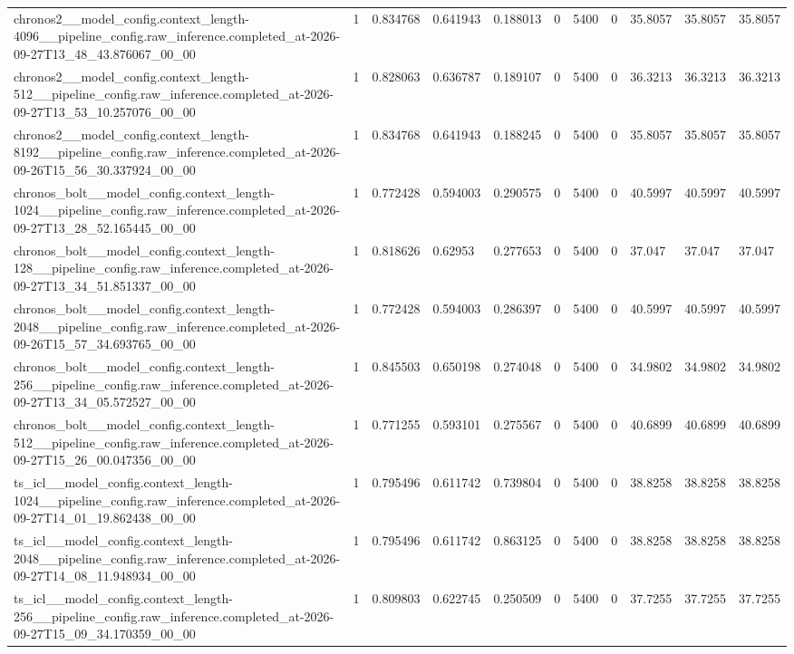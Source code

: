 \begin{tabular}{lllllllllll}
chronos2\_\_model\_config.context\_length-4096\_\_pipeline\_config.raw\_inference.completed\_at-2026-09-27T13\_48\_43.876067\_00\_00 & 1 & 0.834768 & 0.641943 & 0.188013 & 0 & 5400 & 0 & 35.8057 & 35.8057 & 35.8057 \\
chronos2\_\_model\_config.context\_length-512\_\_pipeline\_config.raw\_inference.completed\_at-2026-09-27T13\_53\_10.257076\_00\_00 & 1 & 0.828063 & 0.636787 & 0.189107 & 0 & 5400 & 0 & 36.3213 & 36.3213 & 36.3213 \\
chronos2\_\_model\_config.context\_length-8192\_\_pipeline\_config.raw\_inference.completed\_at-2026-09-26T15\_56\_30.337924\_00\_00 & 1 & 0.834768 & 0.641943 & 0.188245 & 0 & 5400 & 0 & 35.8057 & 35.8057 & 35.8057 \\
chronos\_bolt\_\_model\_config.context\_length-1024\_\_pipeline\_config.raw\_inference.completed\_at-2026-09-27T13\_28\_52.165445\_00\_00 & 1 & 0.772428 & 0.594003 & 0.290575 & 0 & 5400 & 0 & 40.5997 & 40.5997 & 40.5997 \\
chronos\_bolt\_\_model\_config.context\_length-128\_\_pipeline\_config.raw\_inference.completed\_at-2026-09-27T13\_34\_51.851337\_00\_00 & 1 & 0.818626 & 0.62953 & 0.277653 & 0 & 5400 & 0 & 37.047 & 37.047 & 37.047 \\
chronos\_bolt\_\_model\_config.context\_length-2048\_\_pipeline\_config.raw\_inference.completed\_at-2026-09-26T15\_57\_34.693765\_00\_00 & 1 & 0.772428 & 0.594003 & 0.286397 & 0 & 5400 & 0 & 40.5997 & 40.5997 & 40.5997 \\
chronos\_bolt\_\_model\_config.context\_length-256\_\_pipeline\_config.raw\_inference.completed\_at-2026-09-27T13\_34\_05.572527\_00\_00 & 1 & 0.845503 & 0.650198 & 0.274048 & 0 & 5400 & 0 & 34.9802 & 34.9802 & 34.9802 \\
chronos\_bolt\_\_model\_config.context\_length-512\_\_pipeline\_config.raw\_inference.completed\_at-2026-09-27T15\_26\_00.047356\_00\_00 & 1 & 0.771255 & 0.593101 & 0.275567 & 0 & 5400 & 0 & 40.6899 & 40.6899 & 40.6899 \\
ts\_icl\_\_model\_config.context\_length-1024\_\_pipeline\_config.raw\_inference.completed\_at-2026-09-27T14\_01\_19.862438\_00\_00 & 1 & 0.795496 & 0.611742 & 0.739804 & 0 & 5400 & 0 & 38.8258 & 38.8258 & 38.8258 \\
ts\_icl\_\_model\_config.context\_length-2048\_\_pipeline\_config.raw\_inference.completed\_at-2026-09-27T14\_08\_11.948934\_00\_00 & 1 & 0.795496 & 0.611742 & 0.863125 & 0 & 5400 & 0 & 38.8258 & 38.8258 & 38.8258 \\
ts\_icl\_\_model\_config.context\_length-256\_\_pipeline\_config.raw\_inference.completed\_at-2026-09-27T15\_09\_34.170359\_00\_00 & 1 & 0.809803 & 0.622745 & 0.250509 & 0 & 5400 & 0 & 37.7255 & 37.7255 & 37.7255 \\

\end{tabular}
